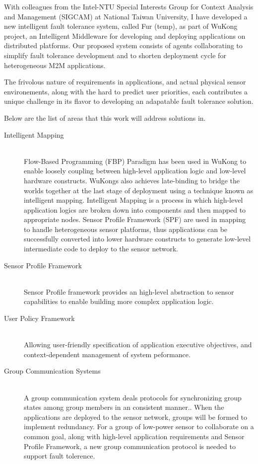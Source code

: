 With colleagues from the Intel-NTU Special Interests Group for Context Analysis 
and Management (SIGCAM) at National Taiwan University, I have developed a 
new intelligent fault tolerance system, called Fur (temp), as part of WuKong
project, an Intelligent Middleware for developing and deploying 
applications on distributed platforms. Our proposed system consists of agents
collaborating to simplify fault
tolerance development and to shorten deployment cycle for heterogeneous M2M
applications.

The frivolous nature of requirements in applications, and actual physical sensor 
environements, along with the hard to predict user priorities, each contributes
a unique challenge in its flavor to developing an adapatable fault tolerance 
solution.

Below are the list of areas that this work will address solutions in.

\begin{description}
\item[Intelligent Mapping] \hfill \\
Flow-Based Programming (FBP) Paradigm has been used in WuKong to enable loosely
coupling between high-level application logic and low-level hardware
constructs. WuKongs
also achieves late-binding to bridge the worlds together at the last stage of
deployment using a technique
known as intelligent mapping. Intelligent Mapping is a process in which
high-level application logics are broken down into components and then mapped
to appropriate nodes. Sensor Profile Framework (SPF) are used in mapping to
handle heterogeneous sensor platforms, thus applications can be successfully
converted into lower hardware constructs to generate low-level intermediate
code to deploy to the sensor network.

\item[Sensor Profile Framework] \hfill \\
Sensor Profile framework provides an high-level abstraction to
sensor capabilities to enable building more complex application
logic.\cite{Reijers}

\item[User Policy Framework] \hfill \\
Allowing user-friendly specification of application executive objectives, and
context-dependent management of system peformance.

\item[Group Communication Systems] \hfill \\
A group communication system deals protocols for
synchronizing group states among group members in an consistent manner.\cite{Birman2012c}.
When the applications are deployed to the sensor network, groups will be
formed to implement redundancy. For a group of low-power sensor to collaborate on
a common goal, along with high-level application requirements and Sensor
Profile Framework, a new group communication protocol is needed to support 
fault tolerence.

\end{description}

